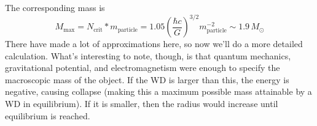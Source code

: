 \documentclass[10pt]{article}
\numberwithin{equation}{section}
\begin{document}
		The corresponding mass is 
		\begin{equation}
			\label{eq:wd_struc:16} M_{\mathrm{max}} = N_{\mathrm{crit}} * m_{\mathrm{particle}} = 1.05 \left(\frac{\hbar c}{G}\right)^{3/2}m_{\mathrm{particle}}^{-2}\sim 1.9\,M_\odot
		\end{equation}
		There have made a lot of approximations here, so now we'll do a more detailed calculation. What's interesting to note, though, is that quantum mechanics, gravitational potential, and electromagnetism were enough to specify the macroscopic mass of the object. If the WD is larger than this, the energy is negative, causing collapse (making this a maximum possible mass attainable by a WD in equilibrium). If it is smaller, then the radius would increase until equilibrium is reached.\\
		
\end{document}
